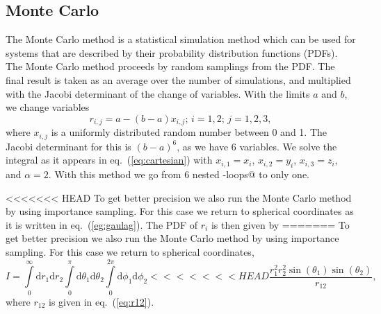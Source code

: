 \documentclass{article}
\begin{document}
\begin{multicols}{2}
\subsection{Monte Carlo}
The Monte Carlo method is a statistical simulation method which can be used for systems that are described by their probability distribution functions (PDFs). The Monte Carlo method proceeds by random samplings from the PDF. The final result is taken as an average over the number of simulations, and multiplied with the Jacobi determinant of the change of variables. With the limits $a$ and $b$, we change variables 
\begin{equation}
	r_{i,j} = a - (b-a)x_{i,j};\,i=1,2;\,j=1,2,3,
\end{equation}
where $x_{i,j}$ is a uniformly distributed random number between 0 and 1.
The Jacobi determinant for this is $(b-a)^6$, as we have 6 variables.
We solve the integral as it appears in eq.~(\ref{eq:cartesian}) with $x_{i,1} = x_i$, $x_{i,2} = y_i$, $x_{i,3} = z_i$, and $\alpha=2$. With this method we go from 6 nested \verb@for-loops@ to only one.

<<<<<<< HEAD
To get better precision we also run the Monte Carlo method by using importance sampling. For this case we return to spherical coordinates as it is written in eq.~(\ref{eg:gaulag}). The PDF of $r_i$ is then given by
=======
To get better precision we also run the Monte Carlo method by using importance sampling. For this case we return to spherical coordinates,
\begin{equation}
	I = \int\limits_0^{\infty}\mathrm{d}r_1\mathrm{d}r_2\int\limits_0^{\pi}\mathrm{d}\theta_1\mathrm{d}\theta_2\int\limits_0^{2\pi}\mathrm{d}\phi_1\mathrm{d}\phi_2
<<<<<<< HEAD
	\frac{r_1^2r_2^2\sin(\theta_1)\sin(\theta_2)}{r_{12}},
\end{equation}
where $r_{12}$ is given in eq.~(\ref{eq:r12}).


\end{multicols}
\end{document}
